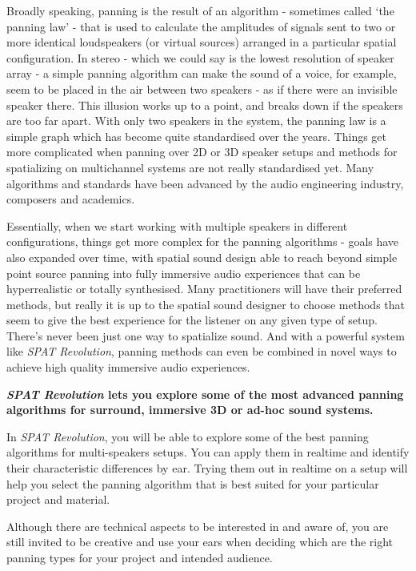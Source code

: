 \documentclass[
  letterpaper,
  DIV=11,
  numbers=noendperiod]{scrreport}
\begin{document}
Broadly speaking, panning is the result of an algorithm - sometimes
called `the panning law' - that is used to calculate the amplitudes of
signals sent to two or more identical loudspeakers (or virtual sources)
arranged in a particular spatial configuration. In stereo - which we
could say is the lowest resolution of speaker array - a simple panning
algorithm can make the sound of a voice, for example, seem to be placed
in the air between two speakers - as if there were an invisible speaker
there. This illusion works up to a point, and breaks down if the
speakers are too far apart. With only two speakers in the system, the
panning law is a simple graph which has become quite standardised over
the years. Things get more complicated when panning over 2D or 3D
speaker setups and methods for spatializing on multichannel systems are
not really standardised yet. Many algorithms and standards have been
advanced by the audio engineering industry, composers and academics.

Essentially, when we start working with multiple speakers in different
configurations, things get more complex for the panning algorithms -
goals have also expanded over time, with spatial sound design able to
reach beyond simple point source panning into fully immersive audio
experiences that can be hyperrealistic or totally synthesised. Many
practitioners will have their preferred methods, but really it is up to
the spatial sound designer to choose methods that seem to give the best
experience for the listener on any given type of setup. There's never
been just one way to spatialize sound. And with a powerful system like
\emph{SPAT Revolution}, panning methods can even be combined in novel
ways to achieve high quality immersive audio experiences.

\textbf{\emph{SPAT Revolution} lets you explore some of the most
advanced panning algorithms for surround, immersive 3D or ad-hoc sound
systems.}

In \emph{SPAT Revolution}, you will be able to explore some of the best
panning algorithms for multi-speakers setups. You can apply them in
realtime and identify their characteristic differences by ear. Trying
them out in realtime on a setup will help you select the panning
algorithm that is best suited for your particular project and material.

Although there are technical aspects to be interested in and aware of,
you are still invited to be creative and use your ears when deciding
which are the right panning types for your project and intended
audience.
\end{document}
